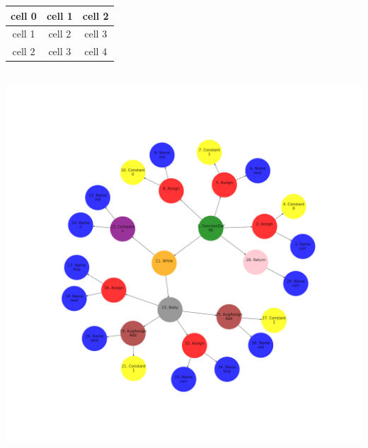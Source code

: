 \documentclass{article}
\begin{document}
\begin{center}
\begin{tabular}{| c | c | c |}
\hline
cell 0 & cell 1 & cell 2\\\hline
cell 1 & cell 2 & cell 3\\\hline
cell 2 & cell 3 & cell 4\\\hline
\end{tabular}
\\\includegraphics[scale=0.3]{artifacts/example}
\end{center}
\end{document}
